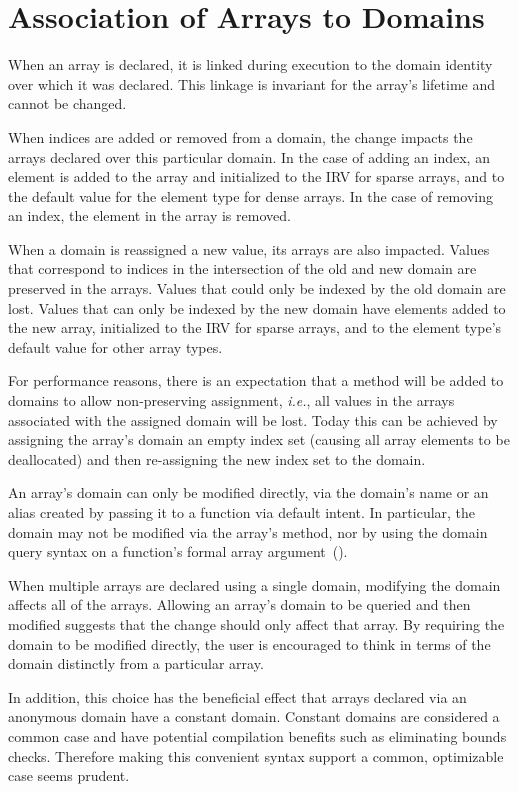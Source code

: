 \section{Association of Arrays to Domains}
\label{Association_of_Arrays_to_Domains}

%
%

When an array is declared, it is linked during execution to the domain
identity over which it was declared.  This linkage is invariant for
the array's lifetime and cannot be changed.

When indices are added or removed from a domain, the change impacts
the arrays declared over this particular domain.  In the case of
adding an index, an element is added to the array and initialized to
the IRV for sparse arrays, and to the default value for the element
type for dense arrays.  In the case of removing an index, the element
in the array is removed.

When a domain is reassigned a new value, its arrays are also impacted.
Values that correspond to indices in the intersection of the old and
new domain are preserved in the arrays.  Values that could only be
indexed by the old domain are lost.  Values that can only be indexed
by the new domain have elements added to the new array, initialized to
the IRV for sparse arrays, and to the element type's default value for
other array types.

For performance reasons, there is an expectation that a method will be
added to domains to allow non-preserving assignment, \emph{i.e.}, all
values in the arrays associated with the assigned domain will be lost.
Today this can be achieved by assigning the array's domain an empty
index set (causing all array elements to be deallocated) and then
re-assigning the new index set to the domain.

An array's domain can only be modified directly, via the domain's name
or an alias created by passing it to a function via default intent.  In
particular, the domain may not be modified via the array's
 method, nor by using the domain query syntax on a
function's formal array
argument~().

\begin{rationale}
When multiple arrays are declared using a single domain, modifying the
domain affects all of the arrays.  Allowing an array's domain to be
queried and then modified suggests that the change should only affect
that array.  By requiring the domain to be modified directly, the user
is encouraged to think in terms of the domain distinctly from a
particular array.

In addition, this choice has the beneficial effect that arrays
declared via an anonymous domain have a constant domain.  Constant
domains are considered a common case and have potential compilation
benefits such as eliminating bounds checks.  Therefore making this
convenient syntax support a common, optimizable case seems prudent.
\end{rationale}


